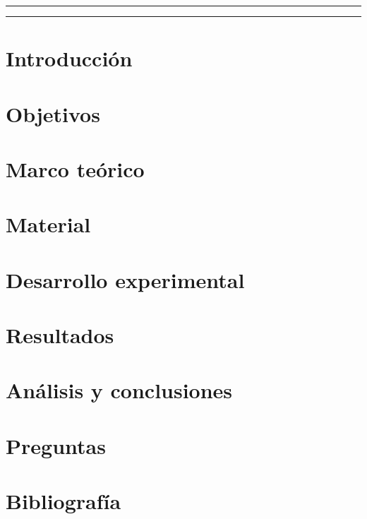 \documentclass[11pt,letterpaper]{article}
\newcommand{\colorhrule}[3]{\begingroup\color{#1}\rule{#2}{#3}\endgroup}
\begin{document}
\begin{center}
\colorhrule{negro}{16.5cm}{1.2pt}
\end{center}
\begin{abstract}
\noindent 
\end{abstract}
\begin{center}
\vspace{-0.1mm}
\colorhrule{gris}{16.5cm}{0.7pt}
\end{center}
\begin{multicols}{2}

\section{Introducción}


\section{Objetivos}


\section{Marco teórico}


\section{Material}


\section{Desarrollo experimental}


\section{Resultados}


\section{Análisis y conclusiones}



\section{Preguntas}


\section{Bibliografía}


\end{multicols}
\end{document}
